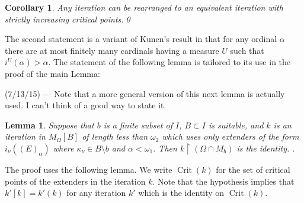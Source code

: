 \documentclass[
twoside,
]{article}
\newtheorem{lemma}[theorem]{Lemma}
\newtheorem{corollary}[theorem]{Corollary}
\theoremstyle{definition}
\theoremstyle{remark}
\newcommand{\ufFromExt}[2]{(#1)_{#2}}
\newcommand{\ords}{\Omega}
\DeclareMathOperator{\Crit}{Crit}
\newcommand{\restrict}{{\upharpoonright}}
\begin{document}
  

    \begin{corollary}
      \label{thm:reorderiteration}
      Any iteration  can be rearranged to an equivalent iteration with strictly increasing critical points.\qed
    \end{corollary}

The second statement is a variant of Kunen's result in 
\cite{Kunen1973A-model-for-the} that for any ordinal $\alpha$ there
are at most finitely many cardinals having a measure $U$ such that
$i^U(\alpha)>\alpha$.  The statement of the  following lemma is tailored to its use
in the proof of the main Lemma:
\begin{todoenv}
  (7/13/15) --- 
  Note that a more general version of this next lemma is actually
  used.   I can't think of a good way to state it.
\end{todoenv}
    \begin{lemma}\label{thm:M_bDoesntmove}
      Suppose that $b$ is a finite subset of $I$, $B\subset I$ is suitable, and
      $k$ is an iteration in $M_\ords[B]$ of length less than
      $\omega_2$ which  uses only
      extenders of the form $i_{\nu}(\ufFromExt{E}{\alpha})$ where
      $\kappa_\nu\in B\setminus b$ and $\alpha<\omega_1$.   Then
      $k\restrict (\ords\cap M_b)$ is the identity.    .
    \end{lemma}
    The proof uses the following lemma.   We write $\Crit(k)$ for the set of  critical
    points of the extenders in the iteration $k$.  Note that the
    hypothesis implies that $k'[k]=k'(k)$ for any iteration $k'$ which is
    the identity on $\Crit(k)$.
\end{document}
